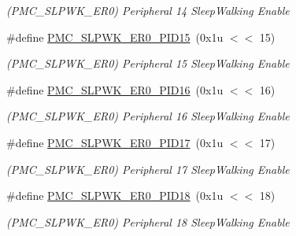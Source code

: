 \begin{DoxyCompactItemize}
\begin{DoxyCompactList}\small\item\em (P\+M\+C\+\_\+\+S\+L\+P\+W\+K\+\_\+\+E\+R0) Peripheral 14 Sleep\+Walking Enable \end{DoxyCompactList}\item 
\mbox{\label{group__SAMV71__PMC_ga87b3b759b1c541a1812078d3fabbd40e}} 
\#define \mbox{\hyperlink{group__SAMV71__PMC_ga87b3b759b1c541a1812078d3fabbd40e}{P\+M\+C\+\_\+\+S\+L\+P\+W\+K\+\_\+\+E\+R0\+\_\+\+P\+I\+D15}}~(0x1u $<$$<$ 15)
\begin{DoxyCompactList}\small\item\em (P\+M\+C\+\_\+\+S\+L\+P\+W\+K\+\_\+\+E\+R0) Peripheral 15 Sleep\+Walking Enable \end{DoxyCompactList}\item 
\mbox{\label{group__SAMV71__PMC_ga13c2d732fdc323eb6082969ce7dd1787}} 
\#define \mbox{\hyperlink{group__SAMV71__PMC_ga13c2d732fdc323eb6082969ce7dd1787}{P\+M\+C\+\_\+\+S\+L\+P\+W\+K\+\_\+\+E\+R0\+\_\+\+P\+I\+D16}}~(0x1u $<$$<$ 16)
\begin{DoxyCompactList}\small\item\em (P\+M\+C\+\_\+\+S\+L\+P\+W\+K\+\_\+\+E\+R0) Peripheral 16 Sleep\+Walking Enable \end{DoxyCompactList}\item 
\mbox{\label{group__SAMV71__PMC_ga0edf786eabc0ca3cf5b8b583f7a59ff8}} 
\#define \mbox{\hyperlink{group__SAMV71__PMC_ga0edf786eabc0ca3cf5b8b583f7a59ff8}{P\+M\+C\+\_\+\+S\+L\+P\+W\+K\+\_\+\+E\+R0\+\_\+\+P\+I\+D17}}~(0x1u $<$$<$ 17)
\begin{DoxyCompactList}\small\item\em (P\+M\+C\+\_\+\+S\+L\+P\+W\+K\+\_\+\+E\+R0) Peripheral 17 Sleep\+Walking Enable \end{DoxyCompactList}\item 
\mbox{\label{group__SAMV71__PMC_ga00c98e4030fb34cad748b3008bd1d66e}} 
\#define \mbox{\hyperlink{group__SAMV71__PMC_ga00c98e4030fb34cad748b3008bd1d66e}{P\+M\+C\+\_\+\+S\+L\+P\+W\+K\+\_\+\+E\+R0\+\_\+\+P\+I\+D18}}~(0x1u $<$$<$ 18)
\begin{DoxyCompactList}\small\item\em (P\+M\+C\+\_\+\+S\+L\+P\+W\+K\+\_\+\+E\+R0) Peripheral 18 Sleep\+Walking Enable \end{DoxyCompactList}\item 

\end{DoxyCompactItemize}
